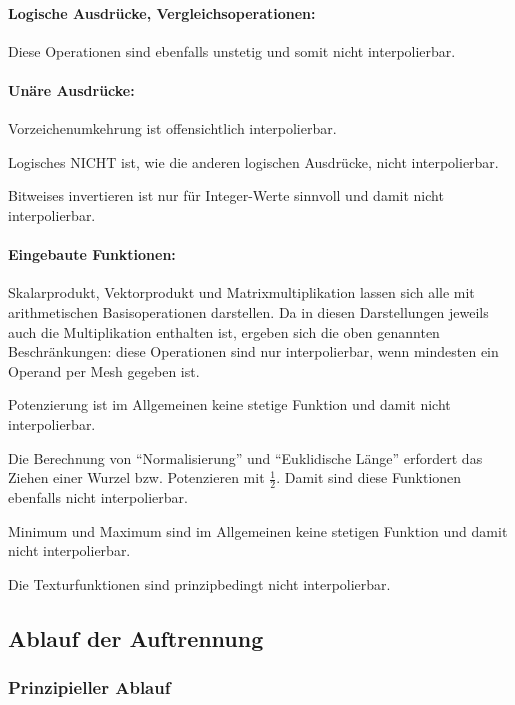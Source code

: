 \documentclass[twoside,a4paper,fleqn,12pt]{book}
\begin{document}
\paragraph{Logische Ausdrücke, Vergleichsoperationen:} Diese Operationen sind ebenfalls unstetig und somit nicht interpolierbar.

\paragraph{Unäre Ausdrücke:} Vorzeichenumkehrung ist offensichtlich interpolierbar.

Logisches NICHT ist, wie die anderen logischen Ausdrücke, nicht interpolierbar.

Bitweises invertieren ist nur für Integer-Werte sinnvoll und damit nicht interpolierbar.

\paragraph{Eingebaute Funktionen:} \label{split_builtins}
Skalarprodukt, Vektorprodukt und Matrixmultiplikation lassen sich alle mit arithmetischen Basisoperationen darstellen.
Da in diesen Darstellungen jeweils auch die Multiplikation enthalten ist, ergeben sich die oben genannten Beschränkungen:
diese Operationen sind nur interpolierbar, wenn mindesten ein Operand per Mesh gegeben ist.

Potenzierung ist im Allgemeinen keine stetige Funktion und damit nicht interpolierbar.

Die Berechnung von "`Normalisierung"' und "`Euklidische Länge"' erfordert das Ziehen einer Wurzel bzw. Potenzieren mit $\frac{1}{2}$.
Damit sind diese Funktionen ebenfalls nicht interpolierbar.

Minimum und Maximum sind im Allgemeinen keine stetigen Funktion und damit nicht interpolierbar.

Die Texturfunktionen sind prinzipbedingt nicht interpolierbar.

\subsection{Ablauf der Auftrennung}
\label{auftrennung_ablauf}

\subsubsection{Prinzipieller Ablauf}
\end{document}
